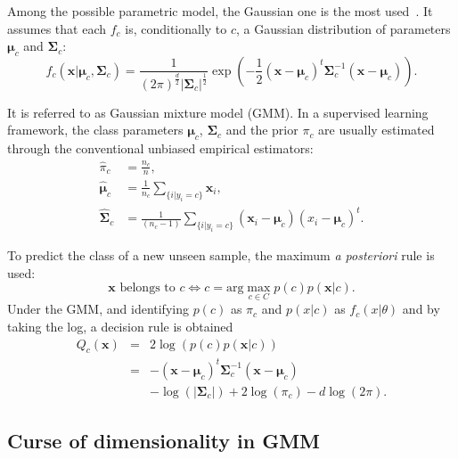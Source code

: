 \documentclass[journal,peerreview,onecolumn]{IEEEtran}
\begin{document}
    Among the possible parametric model,  the Gaussian one is the most
    used~\cite{bouveyron2014model}.   It assumes  that each  $f_c$ is,
    conditionally  to  $c$,  a  Gaussian  distribution  of  parameters
    $\boldsymbol{\mu}_c$    and    $\boldsymbol{\Sigma}_c$:
    \begin{equation*}
        f_c(\mathbf{x}|\boldsymbol{\mu}_c, \boldsymbol{\Sigma}_c) = \frac{1}{(2\pi)^{\frac{d}{2}} |\boldsymbol{\Sigma}_c|^{\frac{1}{2}}} \exp \left( -\frac{1}{2} (\mathbf{x} - \boldsymbol{\mu}_c)^t \boldsymbol{\Sigma}_c^{-1} (\mathbf{x} - \boldsymbol{\mu}_c) \right).
    \end{equation*}

    It  is  referred  to  as  Gaussian  mixture  model  (GMM).   In  a
    supervised    learning    framework,    the    class    parameters
    $\boldsymbol{\mu}_c$,   $\boldsymbol{\Sigma}_c$   and  the   prior
    $\pi_c$ are  usually estimated  through the  conventional unbiased
    empirical estimators:
    \begin{align}
        \hat{\pi}_c &= \frac{n_c}{n},\\
        \hat{\boldsymbol{\mu}}_c &= \frac{1}{n_c} \sum_{\{i|y_i = c\}} \mathbf{x}_i ,\\
        \hat{\boldsymbol{\Sigma}}_c &= \frac{1}{(n_c - 1)} \sum_{\{i|y_i = c\}} (\mathbf{x}_i - \boldsymbol{\mu}_c) (\boldsymbol{}x_i - \boldsymbol{\mu}_c)^t.
    \end{align}

    To predict the  class of a new unseen sample,  the maximum \emph{a
      posteriori}  rule  is  used:
    \begin{equation*}
        \mathbf{x} \text{ belongs to } c \Leftrightarrow c = \text{arg} \max_{c \in C} p(c) p(\mathbf{x}|c).
    \end{equation*}
    Under the GMM,  and identifying $p(c)$ as $\pi_c$  and $p(x|c)$ as
    $f_c(x|\theta)$ and by taking the log, a decision rule is obtained
    \begin{eqnarray}\label{eq:decision}
      Q_c(\mathbf{x}) &=& 2 \log \left( p(c) p(\mathbf{x}|c) \right) \nonumber \\
                      &=& - (\mathbf{x} - \boldsymbol{\mu}_c)^t \boldsymbol{\Sigma}_c^{-1} (\mathbf{x} - \boldsymbol{\mu}_c) \nonumber \\
                      & &-\log (|\boldsymbol{\Sigma}_c|) + 2 \log (\pi_c) - d \log (2\pi).
    \end{eqnarray}

    \subsection{Curse of dimensionality in GMM}
    \label{sec:curse:gmm}
\end{document}
